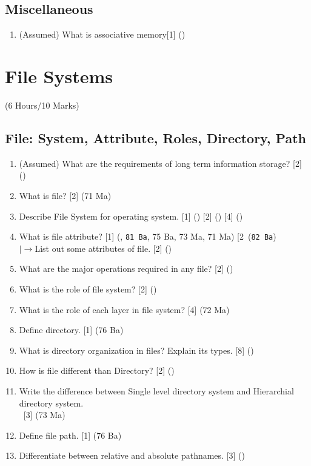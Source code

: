 \documentclass[12pt]{article}
\newcommand{\lb}{\\$\left|\rightarrow\right.$}
\newcommand{\enter}{\\\textcolor{white}{1}}
\begin{document}
	\subsection{Miscellaneous}
		\begin{enumerate}[topsep=0pt]
			\item (Assumed) What is associative memory\hfill [1] ()
		\end{enumerate}

	\pagebreak

\section{File Systems}
	\begin{center}(6 Hours/10 Marks)\end{center}
	\subsection{File: System, Attribute, Roles, Directory, Path}
		\begin{enumerate}[noitemsep, topsep=0pt]
			\item (Assumed) What are the requirements of long term information storage? \hfill [2] ()

			\item What is file? \hfill [2] (71 Ma)
			
			\item Describe File System for operating system. \hfill [1] () [2] () [4] ()

			\item What is file attribute? \hfill [1] (, \texttt{81 Ba}, 75 Ba, 73 Ma, 71 Ma) [2\ (\texttt{82 Ba})
			\lb List out some attributes of file. \hfill [2] ()

			\item What are the major operations required in any file? \hfill [2] ()

			\item What is the role of file system? \hfill [2] ()

			\item What is the role of each layer in file system? \hfill [4] (72 Ma)
			
			\item Define directory. \hfill [1] (76 Ba)
			
			\item What is directory organization in files? Explain its types. \hfill [8] ()

			\item How is file different than Directory? \hfill [2] ()\item Write the difference between Single level directory system and Hierarchial directory system.
				\enter\hfill [3] (73 Ma)
			
			\item Define file path. \hfill [1] (76 Ba)

			\item Differentiate between relative and absolute pathnames. \hfill [3] ()
		\end{enumerate}
\end{document}
